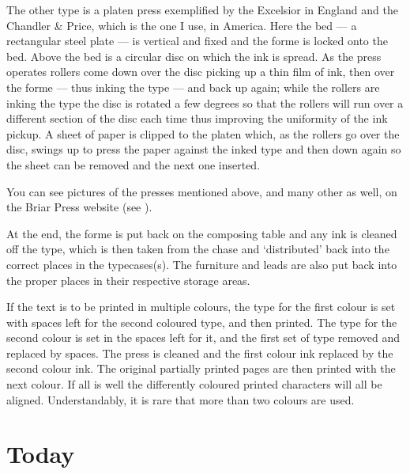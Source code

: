 \documentclass[10pt,a4paper,oneside,extrafontsizes]{memoir}%
\begin{document}
\begin{paracol}{2}
    The other type is a platen press 
exemplified by the Excelsior in England 
and the Chandler \& Price, which 
is the one I use, in America. Here the bed --- a rectangular steel plate ---
is vertical and fixed and the forme is locked onto the bed. Above the bed
is a circular disc on which the ink is spread. As the press operates rollers
come down over the disc picking up a thin film of ink, 
then over the forme --- thus inking the type ---
and back up again; while the rollers are inking the type the disc is
rotated a few degrees so that the rollers will run over a different section 
of the disc each time thus improving the uniformity of the ink pickup. 
A sheet of paper is clipped to the platen which, as the 
rollers go over the disc, swings up to press the paper against the inked type
and then down again so the sheet can be removed and the next one inserted.

    You can see pictures of the presses mentioned above, and many other as 
well, on the 
Briar Press website (see ).

    At the end, the forme is put back on the composing table and any ink 
is cleaned off the type, which is then taken from the chase 
and `distributed' back into
the correct places in the typecases(s). The furniture and
leads are also put back into the proper places in their respective
storage areas.

    If the text is to be printed in multiple colours, the type for the first
colour is set with spaces left for the second coloured type, and then printed.
The type for the second colour is set in the spaces left for it, and the first
set of type removed and replaced by spaces. The press is cleaned and the first
colour ink replaced by the second colour ink. The original partially printed
pages are then printed with the next colour. If all is well the differently
coloured printed characters will all be aligned. Understandably, it is rare 
that more than two colours are used.
\end{paracol}

\section{Today}
\end{document}
